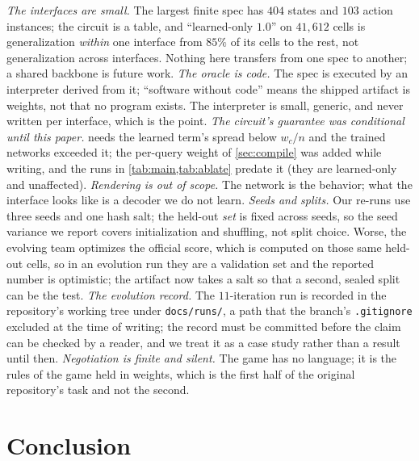 \documentclass{article}
\theoremstyle{plain}
\theoremstyle{definition}
\theoremstyle{remark}
\begin{document}
\emph{The interfaces are small.} The largest finite spec has $404$ states and $103$ action instances; the circuit is a table, and ``learned-only $1.0$'' on $41{,}612$ cells is generalization \emph{within} one interface from $85\%$ of its cells to the rest, not generalization across interfaces. Nothing here transfers from one spec to another; a shared backbone is future work.
\emph{The oracle is code.} The spec is executed by an interpreter derived from it; ``software without code'' means the shipped artifact is weights, not that no program exists. The interpreter is small, generic, and never written per interface, which is the point.
\emph{The circuit's guarantee was conditional until this paper.}  needs the learned term's spread below $w_c/n$ and the trained networks exceeded it; the per-query weight of \cref{sec:compile} was added while writing, and the runs in \cref{tab:main,tab:ablate} predate it (they are learned-only and unaffected).
\emph{Rendering is out of scope.} The network is the behavior; what the interface looks like is a decoder we do not learn.
\emph{Seeds and splits.} Our re-runs use three seeds and one hash salt; the held-out \emph{set} is fixed across seeds, so the seed variance we report covers initialization and shuffling, not split choice. Worse, the evolving team optimizes the official score, which is computed on those same held-out cells, so in an evolution run they are a validation set and the reported number is optimistic; the artifact now takes a salt so that a second, sealed split can be the test.
\emph{The evolution record.} The $11$-iteration run is recorded in the repository's working tree under \texttt{docs/runs/}, a path that the branch's \texttt{.gitignore} excluded at the time of writing; the record must be committed before the claim can be checked by a reader, and we treat it as a case study rather than a result until then.
\emph{Negotiation is finite and silent.} The game has no language; it is the rules of the game held in weights, which is the first half of the original repository's task and not the second.

\section{Conclusion}
\label{sec:conclusion}
\end{document}
